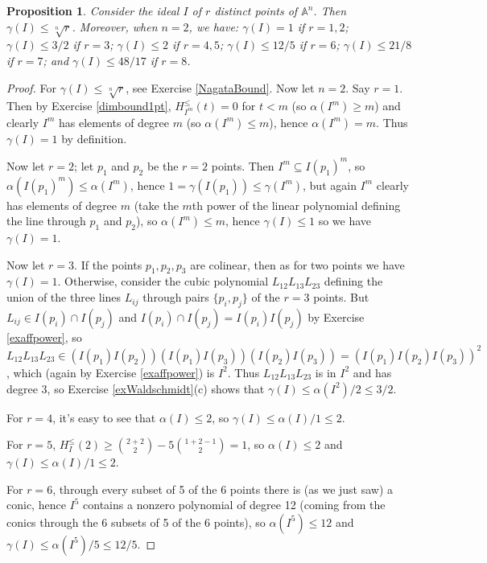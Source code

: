 \documentclass[11pt,twoside]{amsart}
\numberwithin{equation}{section}
\newtheorem{proposition}[theorem]{Proposition}
\theoremstyle{definition}
\begin{document}
\begin{proposition}\label{valsofgammaProp}
Consider the ideal $I$ of $r$ distinct points of ${\mathbb{A}^{{n}}}$.
Then $\gamma(I)\leq\sqrt[n]{r}$. Moreover, when $n=2$, we have:
$\gamma(I)=1$ if $r=1,2$; $\gamma(I)\leq 3/2$ if $r=3$;
$\gamma(I)\leq 2$ if $r=4,5$; $\gamma(I)\leq12/5$ if $r=6$; 
$\gamma(I)\leq21/8$ if $r=7$; and
$\gamma(I)\leq48/17$ if $r=8$.
\end{proposition}

\begin{proof}
For $\gamma(I)\leq\sqrt[n]{r}$, see Exercise \ref{NagataBound}. Now let $n=2$.
Say $r=1$. Then by Exercise \ref{dimbound1pt}, $H^\leq_{I^m}(t)=0$ for $t<m$ (so $\alpha(I^m)\geq m$)
and clearly $I^m$ has elements of degree $m$ (so $\alpha(I^m)\leq m$), hence
$\alpha(I^m)=m$. Thus $\gamma(I)=1$ by definition.

Now let $r=2$; let $p_1$ and $p_2$ be the $r=2$ points. Then $I^m\subseteq I(p_1)^m$,
so $\alpha(I(p_1)^m)\leq \alpha(I^m)$, hence
$1=\gamma(I(p_1))\leq \gamma(I^m)$, but again $I^m$ clearly has elements of degree $m$
(take the $m$th power of the linear polynomial defining the line through $p_1$ and $p_2$),
so $\alpha(I^m)\leq m$, hence $\gamma(I)\leq 1$ so we have $\gamma(I)=1$.

Now let $r=3$. If the points $p_1,p_2,p_3$ 
are colinear, then as for two points we have $\gamma(I)=1$. Otherwise, consider the cubic polynomial $L_{12}L_{13}L_{23}$ defining the union 
of the three lines $L_{ij}$ through pairs $\{p_i,p_j\}$ of the $r=3$ points.
But $L_{ij}\in I(p_i)\cap I(p_j)$ and $I(p_i)\cap I(p_j)=I(p_i)I(p_j)$ by Exercise
\ref{exaffpower}, so $L_{12}L_{13}L_{23}\in 
(I(p_1)I(p_2))(I(p_1)I(p_3))(I(p_2)I(p_3))=(I(p_1)I(p_2)I(p_3))^2$,
which (again by Exercise \ref{exaffpower}) is $I^2$.
Thus $L_{12}L_{13}L_{23}$ is in $I^2$ and has degree 3, so Exercise \ref{exWaldschmidt}(c) 
shows that $\gamma(I)\leq \alpha(I^2)/2 \leq 3/2$.

For $r=4$, it's easy to see that $\alpha(I)\leq 2$, so $\gamma(I)\leq \alpha(I)/1 \leq 2$.

For $r=5$, $H^\leq_I(2)\geq \binom{2+2}{2}-5\binom{1+2-1}{2}=1$, so
$\alpha(I)\leq 2$ and $\gamma(I)\leq \alpha(I)/1 \leq 2$.

For $r=6$, through every subset of 5 of the 6 points there is (as we just saw) a conic,
hence $I^5$ contains a nonzero polynomial of degree 12 (coming from the
conics through the 6 subsets of 5 of the 6 points), so 
$\alpha(I^5)\leq 12$ and $\gamma(I)\leq \alpha(I^5)/5 \leq 12/5$.


\end{proof}
\end{document}
